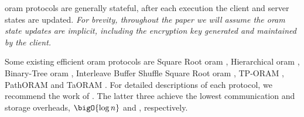 		\acrshort{oram} protocols are generally stateful, after each execution the client and server states are updated.
		\emph{For brevity, throughout the paper we will assume the \acrshort{oram} state updates are implicit, including the encryption key \queryKey{} generated and maintained by the client.}

		Some existing efficient \acrshort{oram} protocols are Square Root \acrshort{oram} \cite{oram-theory}, Hierarchical \acrshort{oram} \cite{oram-original}, Binary-Tree \acrshort{oram} \cite{binary-tree-oram}, Interleave Buffer Shuffle Square Root \acrshort{oram} \cite{shortest-path-oram}, TP-ORAM \cite{tp-oram}, PathORAM \cite{path-oram} and TaORAM \cite{taostore}. %
		For detailed descriptions of each protocol, we recommend the work of \textcite{oram-survey-feifei}.
		The latter three  achieve the lowest communication and storage overheads, $\bigO{\log \dataSize}$ and \bigO{\dataSize}, respectively.

